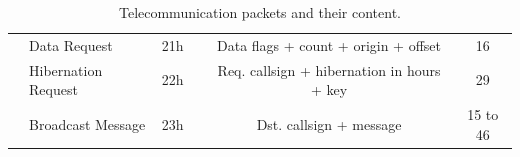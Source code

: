 \begin{landscape}
\begin{table}[ht]
\begin{tabular}{llcccc}
                                      & Data Request          & 21h &                                     & Data flags + count + origin + offset       & 16           \\
                                      & Hibernation Request   & 22h &                                     & Req. callsign + hibernation in hours + key & 29           \\
                                      & Broadcast Message     & 23h &                                     & Dst. callsign + message                    & 15 to 46     \\
            \bottomrule[1.5pt]
        \end{tabular}
        \caption{Telecommunication packets and their content.}
        \label{tab:packets-struct}
    \end{table}
\end{landscape}
